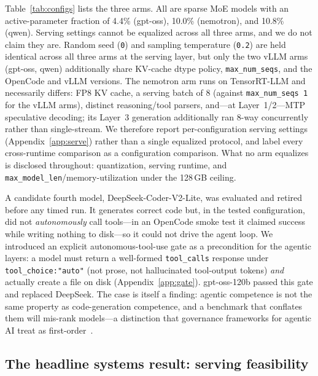 \documentclass[10pt,twocolumn]{article}
\newcommand{\code}[1]{\texttt{\small #1}}
\begin{document}
Table~\ref{tab:configs} lists the three arms. All are sparse MoE models with an
active-parameter fraction of 4.4\% (gpt-oss), 10.0\% (nemotron), and 10.8\% (qwen). Serving
settings cannot be equalized across all three arms, and we do not claim they are. Random seed
(\code{0}) and sampling temperature (\code{0.2}) are held identical across all three arms at the
serving layer, but only the two vLLM arms (gpt-oss, qwen) additionally share KV-cache dtype policy,
\code{max\_num\_seqs}, and the OpenCode and vLLM versions. The nemotron arm runs on
TensorRT-LLM and necessarily differs: FP8 KV cache, a serving batch of 8 (against
\code{max\_num\_seqs 1} for the vLLM arms), distinct reasoning/tool parsers, and---at
Layer~1/2---MTP speculative decoding; its Layer~3 generation additionally ran 8-way
concurrently rather than single-stream. We therefore report per-configuration serving settings
(Appendix~\ref{app:serve}) rather than a single equalized protocol, and label every
cross-runtime comparison as a configuration comparison. What no arm equalizes is disclosed
throughout: quantization, serving runtime, and \code{max\_model\_len}/memory-utilization under
the 128\,GB ceiling.

A candidate fourth model, DeepSeek-Coder-V2-Lite, was evaluated and retired before any timed
run. It generates correct code but, in the tested configuration, did not \emph{autonomously}
call tools---in an OpenCode smoke test it claimed success while writing nothing to disk---so it
could not drive the agent loop. We introduced an explicit autonomous-tool-use gate as a precondition for the agentic
layers: a model must return a well-formed \code{tool\_calls} response under
\code{tool\_choice:"auto"} (not prose, not hallucinated tool-output tokens) \emph{and}
actually create a file on disk (Appendix~\ref{app:gate}). gpt-oss-120b passed this gate and replaced DeepSeek. The case
is itself a finding: agentic competence is not the same property as code-generation
competence, and a benchmark that conflates them will mis-rank models---a distinction that
governance frameworks for agentic AI treat as first-order~\cite{managedautonomy}.

\subsection{The headline systems result: serving feasibility}
\label{subsec:serving}
\end{document}
